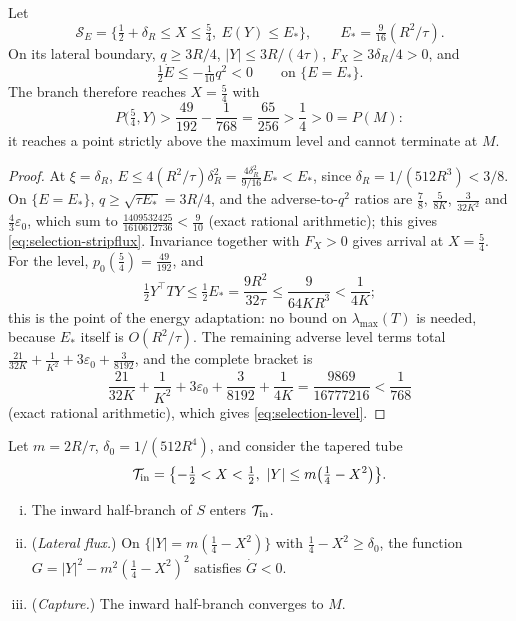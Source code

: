 \begin{lemma}\label{lem:selection-strip}
Let
\[
\mathcal S_E=\bigl\{\tfrac12+\delta_R\le X\le\tfrac54,\ E(Y)\le E_*\bigr\},\qquad E_*=\tfrac9{16}(R^2/\tau).
\]
On its lateral boundary, $q\ge3R/4$, $|Y|\le3R/(4\tau)$, $F_X\ge3\delta_R/4>0$, and
\begin{equation}\label{eq:selection-stripflux}
\tfrac12\dot E\le-\tfrac1{10}q^2<0\qquad\text{on }\{E=E_*\}.
\end{equation}
The branch therefore reaches $X=\frac54$ with
\begin{equation}\label{eq:selection-level}
P\bigl(\tfrac54,Y\bigr)>\frac{49}{192}-\frac1{768}=\frac{65}{256}>\frac14>0=P(M):
\end{equation}
it reaches a point strictly above the maximum level and cannot terminate at $M$.
\end{lemma}

\begin{proof}
At $\xi=\delta_R$, $E\le4(R^2/\tau)\delta_R^2=\frac{4\delta_R^2}{9/16}E_*<E_*$, since $\delta_R=1/(512R^3)<3/8$. On $\{E=E_*\}$, $q\ge\sqrt{\tau E_*}=3R/4$, and the adverse-to-$q^2$ ratios are $\frac78$, $\frac5{8K}$, $\frac3{32K^2}$ and $\frac43\varepsilon_0$, which sum to $\frac{1409532425}{1610612736}<\frac9{10}$ (exact rational arithmetic); this gives \eqref{eq:selection-stripflux}. Invariance together with $F_X>0$ gives arrival at $X=\frac54$. For the level, $p_0(\frac54)=\frac{49}{192}$, and
\[
\tfrac12Y^{\top}TY\le\tfrac12E_*=\frac{9R^2}{32\tau}\le\frac9{64KR^3}<\frac1{4K};
\]
this is the point of the energy adaptation: no bound on $\lambda_{\max}(T)$ is needed, because $E_*$ itself is $O(R^2/\tau)$. The remaining adverse level terms total $\frac{21}{32K}+\frac1{K^2}+3\varepsilon_0+\frac3{8192}$, and the complete bracket is
\[
\frac{21}{32K}+\frac1{K^2}+3\varepsilon_0+\frac3{8192}+\frac1{4K}=\frac{9869}{16777216}<\frac1{768}
\]
(exact rational arithmetic), which gives \eqref{eq:selection-level}.
\end{proof}

\begin{lemma}\label{lem:selection-capture}
Let $m=2R/\tau$, $\delta_0=1/(512R^4)$, and consider the tapered tube
\[
\mathcal T_{\rm in}=\bigl\{-\tfrac12<X<\tfrac12,\ |Y|\le m\bigl(\tfrac14-X^2\bigr)\bigr\}.
\]
\begin{enumerate}[(i)]
\item The inward half-branch of $S$ enters $\mathcal T_{\rm in}$.
\item (\emph{Lateral flux.}) On $\{|Y|=m(\frac14-X^2)\}$ with $\frac14-X^2\ge\delta_0$, the function $G=|Y|^2-m^2(\frac14-X^2)^2$ satisfies $\dot G<0$.
\item (\emph{Capture.}) The inward half-branch converges to $M$.
\end{enumerate}
\end{lemma}

